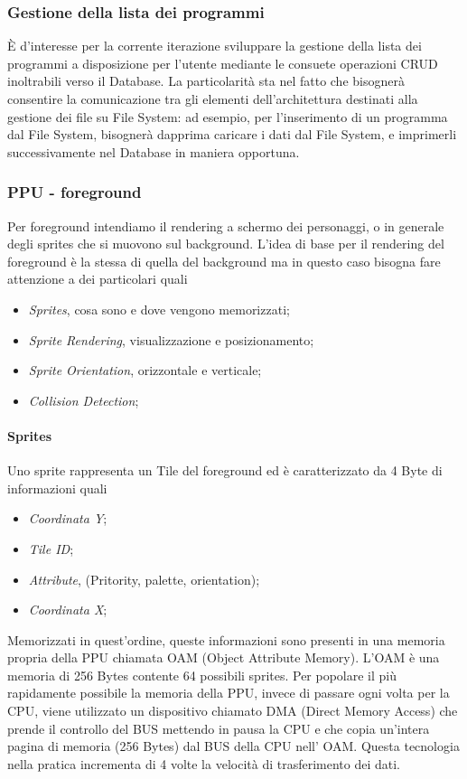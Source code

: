 \documentclass[11pt]{article}
\begin{document}
\subsubsection{Gestione della lista dei programmi}
È d'interesse per la corrente iterazione sviluppare la gestione della lista dei programmi a disposizione per l'utente mediante le consuete operazioni CRUD inoltrabili verso il Database. La particolarità sta nel fatto che bisognerà consentire la comunicazione tra gli elementi dell'architettura destinati alla gestione dei file su File System: ad esempio, per l'inserimento di un programma dal File System, bisognerà dapprima caricare i dati dal File System, e imprimerli successivamente nel Database in maniera opportuna. 

\subsubsection{PPU - foreground }
Per foreground intendiamo il rendering a schermo dei personaggi, o in generale degli sprites che si muovono sul background. L’idea di base per il rendering del foreground è la stessa di quella del background ma in questo caso bisogna fare attenzione a dei particolari quali
\begin{itemize}
\item{
	\emph{Sprites}, cosa sono e dove vengono memorizzati;
}
\item{
	\emph{Sprite Rendering}, visualizzazione e posizionamento;
}
\item{
	\emph{Sprite Orientation}, orizzontale e verticale;
}
\item{
	\emph{Collision Detection};
}
\end{itemize}
\paragraph{Sprites}
Uno sprite rappresenta un Tile del foreground ed è caratterizzato da 4 Byte di informazioni quali
\begin{itemize}
\item{
	\emph{Coordinata Y};
}
\item{
	\emph{Tile ID};
}
\item{
	\emph{Attribute}, (Pritority, palette, orientation);
}
\item{
	\emph{Coordinata X};
}
\end{itemize}
Memorizzati in quest’ordine, queste informazioni sono presenti in una memoria propria della PPU chiamata OAM (Object Attribute Memory). L’OAM è una memoria di 256 Bytes contente 64 possibili sprites. Per popolare il più rapidamente possibile la memoria della PPU, invece di passare ogni volta per la CPU, viene utilizzato un dispositivo chiamato DMA (Direct Memory Access) che prende il controllo del BUS mettendo in pausa la CPU e che copia un’intera pagina di memoria (256 Bytes) dal BUS della CPU nell’ OAM. Questa tecnologia nella pratica incrementa di 4 volte la velocità di trasferimento dei dati.
\end{document}
